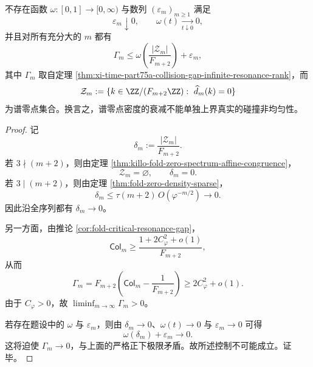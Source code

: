 \begin{theorem}[零点计数不足以控制真实均匀性缺口]\label{thm:xi-time-part75a-zero-counting-insufficient-for-uniformity-gap}
不存在函数 \(\omega:[0,1]\to[0,\infty)\) 与数列 \((\varepsilon_m)_{m\ge 1}\) 满足
\[
\varepsilon_m\downarrow 0,
\qquad
\omega(t)\xrightarrow[t\downarrow 0]{}0,
\]
并且对所有充分大的 \(m\) 都有
\[
\Gamma_m
\le
\omega\!\left(\frac{|\mathcal Z_m|}{F_{m+2}}\right)+\varepsilon_m,
\]
其中 \(\Gamma_m\) 取自定理 \ref{thm:xi-time-part75a-collision-gap-infinite-resonance-rank}，而
\[
\mathcal Z_m:=\{k\in \ZZ/(F_{m+2}\ZZ):\ \widehat d_m(k)=0\}
\]
为谱零点集合。换言之，谱零点密度的衰减不能单独上界真实的碰撞非均匀性。
\end{theorem}
\begin{proof}
记
\[
\delta_m:=\frac{|\mathcal Z_m|}{F_{m+2}}.
\]
若 \(3\nmid(m+2)\)，则由定理 \ref{thm:killo-fold-zero-spectrum-affine-congruence}，
\[
\mathcal Z_m=\varnothing,
\qquad
\delta_m=0.
\]
若 \(3\mid(m+2)\)，则由定理 \ref{thm:fold-zero-density-sparse}，
\[
\delta_m
\le
\tau(m+2)\,O(\varphi^{-m/2})
\longrightarrow 0.
\]
因此沿全序列都有 \(\delta_m\to 0\)。

另一方面，由推论 \ref{cor:fold-critical-resonance-gap}，
\[
\mathsf{Col}_m
\ge
\frac{1+2C_\varphi^2+o(1)}{F_{m+2}},
\]
从而
\[
\Gamma_m
=
F_{m+2}\!\left(\mathsf{Col}_m-\frac{1}{F_{m+2}}\right)
\ge
2C_\varphi^2+o(1).
\]
由于 \(C_\varphi>0\)，故 \(\liminf_{m\to\infty}\Gamma_m>0\)。

若存在题设中的 \(\omega\) 与 \(\varepsilon_m\)，则由 \(\delta_m\to 0\)、\(\omega(t)\to 0\) 与 \(\varepsilon_m\to 0\) 可得
\[
\omega(\delta_m)+\varepsilon_m\longrightarrow 0.
\]
这将迫使 \(\Gamma_m\to 0\)，与上面的严格正下极限矛盾。故所述控制不可能成立。证毕。
\end{proof}

